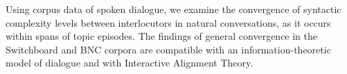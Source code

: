 Using corpus data of spoken dialogue, we examine the convergence of syntactic complexity levels between interlocutors in natural conversations, as it occurs within spans of topic episodes. The findings of general convergence in the Switchboard and BNC corpora are compatible with an information-theoretic model of dialogue and with Interactive Alignment Theory.

